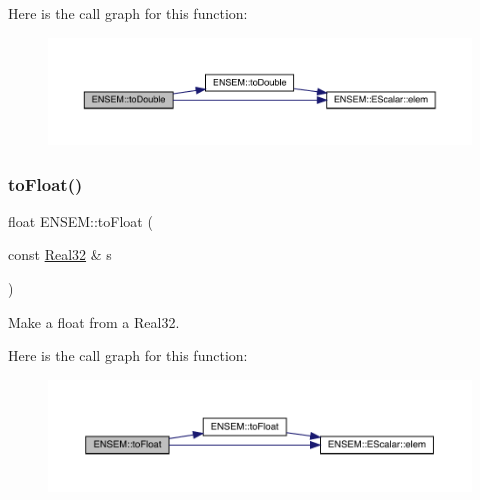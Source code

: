 Here is the call graph for this function\+:\nopagebreak
\begin{figure}[H]
\begin{center}
\leavevmode
\includegraphics[width=350pt]{d2/d94/namespaceENSEM_ac48f5951452a687d3b08acfd4b10d874_cgraph}
\end{center}
\end{figure}
\mbox{\label{namespaceENSEM_a109a3e3e759ebd30afae927366900cd6}} 
\subsubsection{\texorpdfstring{toFloat()}{toFloat()}}
{\footnotesize\ttfamily float E\+N\+S\+E\+M\+::to\+Float (\begin{DoxyParamCaption}\item[{const \mbox{\hyperlink{group__defs_gab601f1c55eb75baed0a0859b3fec6bc1}{Real32}} \&}]{s }\end{DoxyParamCaption})\hspace{0.3cm}{\ttfamily [inline]}}



Make a float from a Real32. 

Here is the call graph for this function\+:\nopagebreak
\begin{figure}[H]
\begin{center}
\leavevmode
\includegraphics[width=350pt]{d2/d94/namespaceENSEM_a109a3e3e759ebd30afae927366900cd6_cgraph}
\end{center}
\end{figure}
\mbox{\label{namespaceENSEM_ada64466467bc2ca84cb2b64dffa8dd02}} 

